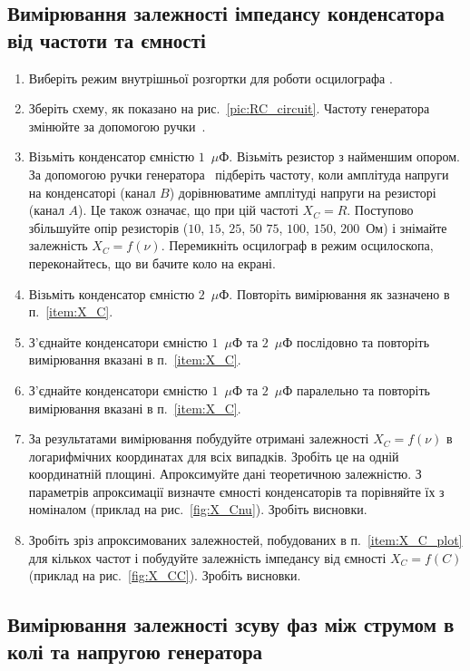 \subsection*{Вимірювання залежності імпедансу конденсатора від частоти та ємності}
\begin{enumerate}
    \item Виберіть режим внутрішньої розгортки для роботи осцилографа .
    \item Зберіть схему, як показано на рис.~\ref{pic:RC_circuit}. Частоту генератора  змінюйте за допомогою ручки~\circled{\ref{btn:Hz}}.
    \item \label{item:X_C} Візьміть конденсатор ємністю $1$~$\mu$Ф. Візьміть резистор з найменшим опором. За допомогою ручки генератора~\circled{\ref{btn:Hz}} підберіть частоту, коли амплітуда напруги на конденсаторі (канал $B$) дорівнюватиме амплітуді напруги на резисторі (канал $A$). Це також означає, що при цій частоті $X_C = R$. Поступово збільшуйте опір резисторів ($10$, $15$, $25$, $50$ $75$, $100$, $150$, $200$~Ом) і знімайте залежність $X_C = f(\nu)$. Перемикніть осцилограф в режим осцилоскопа, переконайтесь, що ви бачите коло на екрані.
    \item  Візьміть конденсатор ємністю $2$~$\mu$Ф. Повторіть вимірювання як зазначено в п.~\ref{item:X_C}.
    \item  З'єднайте конденсатори ємністю $1$~$\mu$Ф та $2$~$\mu$Ф послідовно та повторіть вимірювання вказані в п.~\ref{item:X_C}.
    \item  З'єднайте конденсатори ємністю $1$~$\mu$Ф та $2$~$\mu$Ф паралельно та повторіть вимірювання вказані в п.~\ref{item:X_C}.
    \item \label{item:X_C_plot}За результатами вимірювання побудуйте отримані залежності $X_C = f(\nu)$ в логарифмічних координатах для всіх випадків. Зробіть це на одній координатній площині. Апроксимуйте дані теоретичною залежністю. З параметрів апроксимації визначте ємності конденсаторів та порівняйте їх з номіналом (приклад на рис.~\ref{fig:X_Cnu}). Зробіть висновки.
    \item Зробіть зріз апроксимованих залежностей, побудованих в п.~\ref{item:X_C_plot} для кількох частот і побудуйте залежність імпедансу від ємності $X_C = f(C)$ (приклад на рис.~\ref{fig:X_CC}). Зробіть висновки.
\end{enumerate}

\subsection*{Вимірювання залежності зсуву фаз між струмом в колі та напругою генератора}

